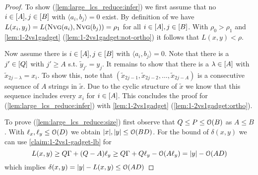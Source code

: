 \begin{proof}
To show (\ref{lem:large_lcs_reduce:infer}) we first assume that no $i \in [A], j \in [B]$ with $\langle a_i, b_j \rangle = 0$ exist.
By definition of \nvgName{} we have $L(x_i, y_j) = L(\text{\textsc{Nvg}}(a_i), \text{\textsc{Nvg}}(b_j)) = \rho_1$ for all $i \in [A], j \in [B]$.
With $\rho_0 > \rho_1$ and \autoref{lem:1-2vs1gadget} (\ref{lem:1-2vs1gadget:not-ortho}) it follows that $L(x,y) < \rho$.

Now assume there is $i \in [A], j \in [B]$ with $\langle a_i, b_j \rangle = 0$.
Note that there is a $j' \in [Q]$ with $j' \geq A$ s.t. $\tilde{y}_{j'} = y_j$.
It remains to show that there is a $\lambda \in [A]$ with $\tilde{x}_{2j - \lambda} = x_i$.
To show this, note that $(\tilde{x}_{2j - 1}, \tilde{x}_{2j - 2}, \ldots, \tilde{x}_{2j - A})$ is a consecutive sequence of $A$ strings in $\tilde{x}$.
Due to the cyclic structure of $\tilde{x}$ we know that this sequence includes every $x_i$ for $i \in [A]$.
This concludes the proof for (\ref{lem:large_lcs_reduce:infer}) with \autoref{lem:1-2vs1gadget} (\ref{lem:1-2vs1gadget:ortho}).

To prove (\ref{lem:large_lcs_reduce:size}) first observe that $Q \leq P \leq \mathcal{O}(B)$ as $A \leq B$. With $\ell_x, \ell_y \leq \mathcal{O}(D)$ we obtain $|x|,|y| \leq \mathcal{O}(BD)$.
For the bound of $\delta(x,y)$ we can use \autoref{claim:1-2vs1-gadget-lb} for
\[
L(x,y) \geq Q\Gamma + (Q - A)\ell_y \geq Q\Gamma + Q\ell_y - \mathcal{O}(A\ell_y) = |y| - \mathcal{O}(AD)
\]
which implies $\delta(x,y) = |y| - L(x,y) \leq \mathcal{O}(AD)$
\end{proof}



